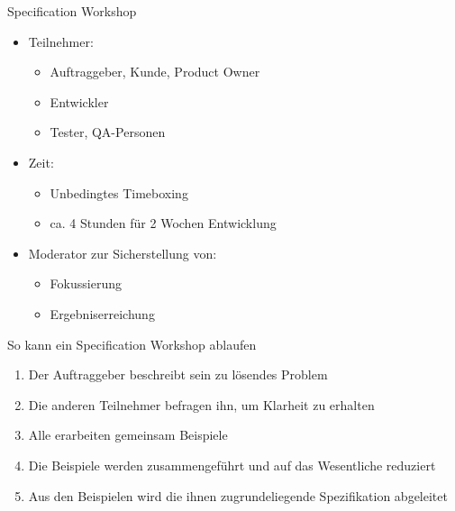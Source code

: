 \begin{frame}{Specification Workshop}

\begin{itemize}
	\item Teilnehmer: 
	\begin{itemize}
		\item Auftraggeber, Kunde, Product Owner
		\item Entwickler
		\item Tester, QA-Personen
	\end{itemize}
	\item Zeit: 
	\begin{itemize}
		\item Unbedingtes Timeboxing
		\item ca. 4 Stunden für 2 Wochen Entwicklung
	\end{itemize}
	\item Moderator zur Sicherstellung von: 
	\begin{itemize}
		\item Fokussierung
		\item Ergebniserreichung
	\end{itemize}
\end{itemize}

\end{frame}



\begin{frame}{So kann ein Specification Workshop ablaufen}

\begin{enumerate}
	\item Der Auftraggeber beschreibt sein zu lösendes Problem
	\item Die anderen Teilnehmer befragen ihn, um Klarheit zu erhalten
	\item Alle erarbeiten gemeinsam Beispiele
	\item Die Beispiele werden zusammengeführt und auf das Wesentliche reduziert
	\item Aus den Beispielen wird die ihnen zugrundeliegende Spezifikation abgeleitet
\end{enumerate}

\end{frame}


